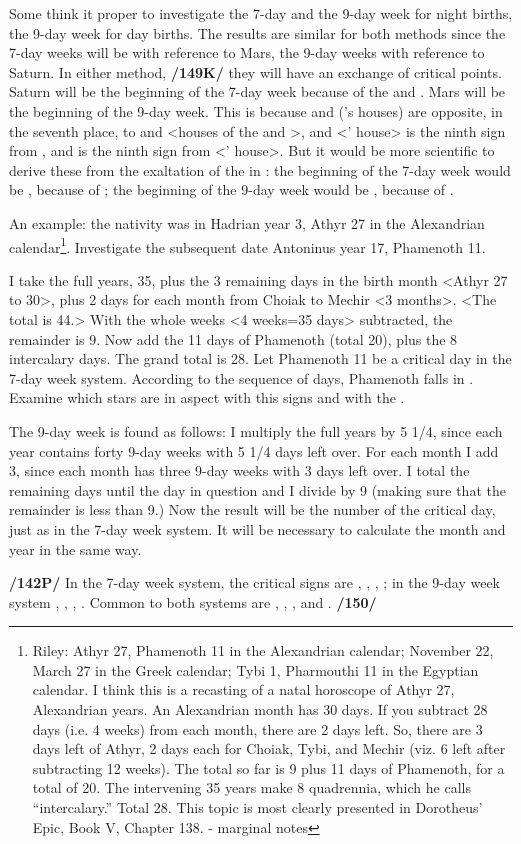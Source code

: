 Some think it proper to investigate the 7-day and the 9-day week for night births, the 9-day week for day births. The results are similar for both methods since the 7-day weeks will be with reference to Mars, the 9-day weeks with reference to Saturn. In either method, \textbf{/149K/} they will have an exchange of critical points. Saturn will be the beginning of the 7-day week because of the \Sun\xspace and \Moon. Mars will be the beginning of the 9-day week. This is because \Capricorn\xspace and \Aquarius\xspace (\Saturn’s houses) are opposite, in the seventh place, to \Cancer\xspace and \Leo\xspace <houses of the \Sun\xspace and \Moon>, and \Aries\xspace <\Mars’ house> is the ninth
sign from \Leo, and \Cancer\xspace is the ninth sign from \Scorpio\xspace <\Mars’ house>. But it would be more scientific to derive these from the exaltation of the \Moon\xspace in \Taurus: the beginning of the 7-day week would be \Mars, because of \Scorpio; the beginning of the 9-day week would be \Saturn, because of \Capricorn.

An example: the nativity was in Hadrian year 3, Athyr 27 in the Alexandrian calendar\footnote{Riley: Athyr 27, Phamenoth 11 in the Alexandrian calendar; November 22, March 27 in the Greek calendar; Tybi 1, Pharmouthi 11 in the Egyptian calendar.
I think this is a recasting of a natal horoscope of Athyr 27, Alexandrian years. An Alexandrian month has 30 days. If you subtract 28 days (i.e. 4 weeks) from each month, there are 2
days left. So, there are 3 days left of Athyr, 2 days each for Choiak, Tybi, and Mechir (viz. 6 left after subtracting 12 weeks). The total so far is 9 plus 11 days of Phamenoth, for a total of 20. The intervening 35 years make 8 quadrennia, which he calls “intercalary.” Total 28. This topic is most clearly presented in Dorotheus’ Epic, Book V, Chapter 138. - marginal notes}. Investigate the subsequent date Antoninus year 17, Phamenoth 11. 

I take the full years, 35, plus the 3 remaining days in the birth month <Athyr 27 to 30>, plus 2 days for each month from Choiak to Mechir <3 months>. <The total is 44.> With the whole weeks <4 weeks=35 days> subtracted, the remainder is 9. Now add the 11 days of Phamenoth (total 20), plus the 8 intercalary days. The grand total is 28. Let Phamenoth 11 be a critical day in the 7-day week system. According to the sequence of days, Phamenoth falls in \Scorpio.
Examine which stars are in aspect with this signs and with the \Moon.

The 9-day week is found as follows: I multiply the full years by 5 1/4, since each year contains forty 9-day weeks with 5 1/4 days left over. For each month I add 3, since each month has three 9-day weeks with 3 days left over. I total the remaining days until the day in question and I divide by 9 (making sure that the remainder is less than 9.) Now the result will be the number of the critical day, just as in the 7-day week system. It will be necessary to calculate the month and year in the same way.

\textbf{/142P/} In the 7-day week system, the critical signs are \Aries, \Libra, \Cancer, \Capricorn; in the 9-day
week system \Taurus, \Leo, \Scorpio, \Aquarius. Common to both systems are \Gemini, \Sagittarius, \Virgo, and \Pisces. \textbf{/150/}

\newpage